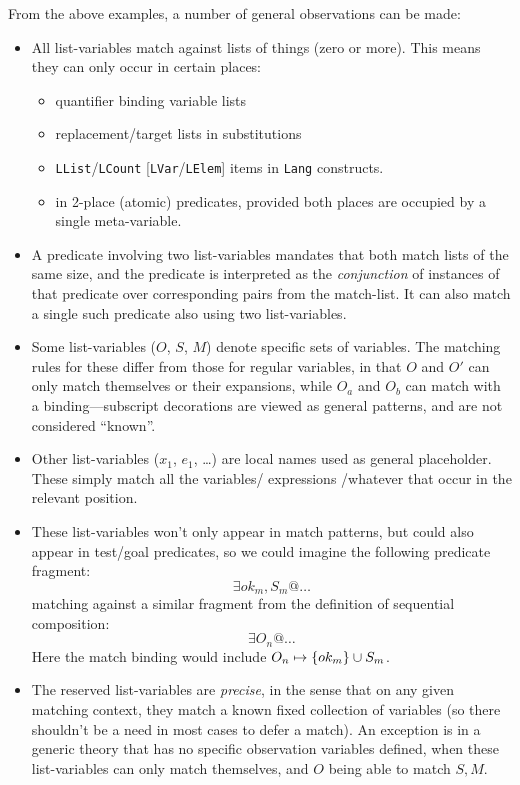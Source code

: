 From the above examples,
a number of general observations can be made:
\begin{itemize}
  \item
    All list-variables match against lists of things (zero or more).
    This means they can only occur in certain places:
    \begin{itemize}
      \item quantifier binding variable lists
      \item replacement/target lists in substitutions
      \item \texttt{LList}/\texttt{LCount} [\texttt{LVar}/\texttt{LElem}]
            items in \texttt{Lang} constructs.
      \item in 2-place (atomic) predicates, provided both places
        are occupied by a single meta-variable.
    \end{itemize}
  \item
    A predicate involving two list-variables mandates that both
    match lists of the same size, and the predicate
    is interpreted as the \emph{conjunction} of instances of that predicate
    over corresponding pairs from the match-list.
    It can also match a single such predicate also using two list-variables.
  \item
    Some list-variables ($O$, $S$, $M$)
    denote specific sets of variables.
    The matching rules for these differ from those for regular variables,
    in that $O$ and $O'$ can only match themselves or their expansions,
    while $O_a$ and $O_b$ can match with a binding---subscript decorations
    are viewed as general patterns, and are not considered ``known''.
  \item
    Other list-variables  ($x_1$, $e_1$, \ldots)
    are local names used as general placeholder.
    These simply match all the variables/ expressions /whatever
    that occur in the relevant position.
  \item
    These list-variables won't only appear in match patterns,
    but could also appear in test/goal predicates,
    so we could imagine the following predicate fragment:
    $$
       \exists ok_m,S_m @ \ldots
    $$
    matching against a similar fragment from the definition of
    sequential composition:
    $$
      \exists O_n @ \ldots
    $$
    Here the match binding would include
    $O_n \mapsto \{{ok_m}\} \cup S_m$.
  \item
    The reserved list-variables are \emph{precise},
    in the sense that on any given matching context,
    they match a known fixed collection of variables
    (so there shouldn't be a need in most cases to defer a match).
    An exception is in a generic theory that has no specific observation
    variables defined, when these list-variables can only match
    themselves, and $O$ being able to match $S,M$.
\end{itemize}
